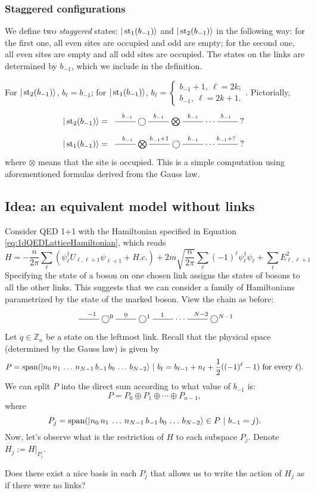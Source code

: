 	\subsubsection{Staggered configurations}
 We define two \emph{staggered} states: $|\operatorname{st}_1(b_{-1})\rangle$ and $|\operatorname{st}_2(b_{-1})\rangle$ in the following way: for the first one, all even sites are occupied and odd are empty; for the second one, all even sites are empty and all odd sites are occupied. The states on the links are determined by $b_{-1}$, which we include in the definition. 
\begin{statement}
For $|\operatorname{st}_2(b_{-1})\rangle$, $
b_{\ell} = b_{-1}$; for $|\operatorname{st}_1(b_{-1})\rangle$, $
b_{\ell} = \begin{cases}
b_{-1} + 1, \ \ell = 2k;\\
b_{-1}, \ \ell = 2k+1.
\end{cases}$. Pictorially,
\[
|\st_2(b_{-1})\rangle =	\xymatrix{
	\ar@{-}[r]^{b_{-1}} & \bigcirc \ar@{-}[r]^{b_{-1}} &  \bigotimes \ar@{-}[r]^{b_{-1}} & \cdots & \ar@{-}[l]_{b_{-1}} ?
	}
\]
\[
|\st_1(b_{-1})\rangle =	\xymatrix{
	\ar@{-}[r]^{b_{-1}} & \bigotimes \ar@{-}[r]^{b_{-1}+1} &  \bigcirc \ar@{-}[r]^{b_{-1}} & \cdots & \ar@{-}[l]_{b_{-1}+?} ?
	}
\]
where $\otimes$ means that the site is occupied. This is a simple computation using aforementioned formulas derived from the Gauss law.
\end{statement}


	
	\subsection{Idea: an equivalent model without links}
	Consider QED 1+1 with the Hamiltonian specified in Equation \ref{eq:1dQEDLatticeHamiltonian}, which reads 
\[
	H=-\frac{n}{2\pi} \sum_\ell (\psi_\ell^\dagger U_{\ell,\ell+1}\psi_{\ell+1}+H.c.) + 2m\sqrt{\frac{n}{2\pi}}\sum_\ell (-1)^\ell \psi_\ell^\dagger\psi_\ell+  \sum_{\ell} E_{\ell,\ell+1}^2
\]
Specifying the state of a boson on one chosen link assigns the states of bosons to all the other links. This suggests that we can consider a family of Hamiltonians parametrized by the state of the marked boson. View the chain as before:
	\[
	\xymatrix{
	\ar@{-}[r]^{-1} & \bigcirc^0 \ar@{-}[r]^{0} &  \bigcirc^1 \ar@{-}[r]^{1} & \cdots & \ar@{-}[l]_{N-2} \bigcirc^{N-1}
	}
	\]
	Let $q \in \mathbb Z_n$ be a state on the leftmost link. Recall that the physical space (determined by the Gauss law) is given by
	\[
	P = \operatorname{span} ( |n_0\, n_1\, \ldots \, n_{N-1} \, b_{-1}\, b_0\, \ldots\, b_{N-2}\rangle \ | \ b_{\ell} =b_{\ell-1} + n_{\ell} + \frac{1}{2}((-1)^\ell-1) \ \text{for every} \ \ell).
	\]
	We can split $P$ into the direct sum according to what value of $b_{-1}$ is:
	\[
	P = P_0 \oplus P_1 \oplus \cdots \oplus P_{n-1},
	\]
	where
	\[
	P_j = \operatorname{span}( |n_0\, n_1\, \ldots \, n_{N-1} \, b_{-1}\, b_0\, \ldots\, b_{N-2}\rangle \in P \ | \ b_{-1} = j).
	\]
	Now, let's observe what is the restriction of $H$ to each subspace $P_j$. Denote $H_j := H|_{P_j}$.
\begin{idea}
Does there exist a nice basis in each $P_j$ that allows us to write the action of $H_j$ as if there were no links?
\end{idea}

